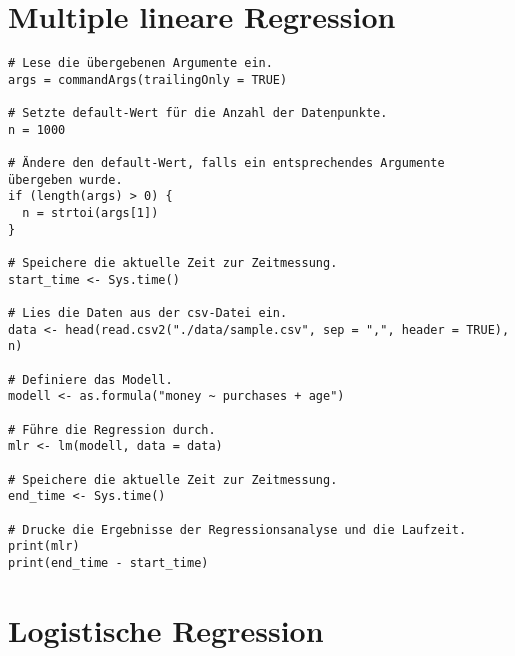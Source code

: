 \section{Multiple lineare Regression}
\label{appendix:B:2}

\begin{verbatim}
# Lese die übergebenen Argumente ein.
args = commandArgs(trailingOnly = TRUE)

# Setzte default-Wert für die Anzahl der Datenpunkte.
n = 1000

# Ändere den default-Wert, falls ein entsprechendes Argumente übergeben wurde.
if (length(args) > 0) {
  n = strtoi(args[1])
}

# Speichere die aktuelle Zeit zur Zeitmessung.
start_time <- Sys.time()

# Lies die Daten aus der csv-Datei ein.
data <- head(read.csv2("./data/sample.csv", sep = ",", header = TRUE), n)

# Definiere das Modell.
modell <- as.formula("money ~ purchases + age")

# Führe die Regression durch.
mlr <- lm(modell, data = data)

# Speichere die aktuelle Zeit zur Zeitmessung.
end_time <- Sys.time()

# Drucke die Ergebnisse der Regressionsanalyse und die Laufzeit.
print(mlr)
print(end_time - start_time)
\end{verbatim}

\section{Logistische Regression}
\label{appendix:B:3}

